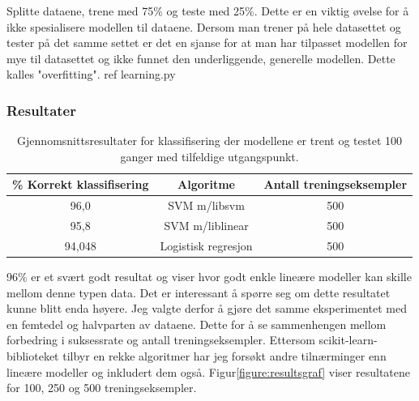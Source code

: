 Splitte dataene, trene med 75\% og teste med 25\%. Dette er en viktig øvelse for å ikke spesialisere modellen til dataene. Dersom man trener på hele datasettet og tester på det samme settet er det en sjanse for at man har tilpasset modellen for mye til datasettet og ikke funnet den underliggende, generelle modellen. Dette kalles "overfitting". {\color{red} ref learning.py}

\subsubsection{Resultater}
\label{ch:2.resultater}
\begin{table}[h!]
\centering
\begin{tabular}{|| c c c ||}
\hline
\% Korrekt klassifisering & Algoritme & Antall treningseksempler\\ [0.5ex] 
 \hline\hline
 96,0 & SVM m/libsvm & 500 \\ 
 \hline
 95,8 & SVM m/liblinear & 500 \\
 \hline
 94,048 & Logistisk regresjon & 500 \\ [1ex]
 \hline
\end{tabular}
\caption{Gjennomsnittsresultater for klassifisering der modellene er trent og testet 100 ganger med tilfeldige utgangspunkt.}
\label{table:results}
\end{table}


96\% er et svært godt resultat og viser hvor godt enkle lineære modeller kan skille mellom denne typen data. Det er interessant å spørre seg om dette resultatet kunne blitt enda høyere. Jeg valgte derfor å gjøre det samme eksperimentet med en femtedel og halvparten av dataene. Dette for å se sammenhengen mellom forbedring i suksessrate og antall treningseksempler. Ettersom scikit-learn-biblioteket tilbyr en rekke algoritmer har jeg forsøkt andre tilnærminger enn lineære modeller og inkludert dem også. Figur\ref{figure:resultsgraf} viser resultatene for 100, 250 og 500 treningseksempler.


